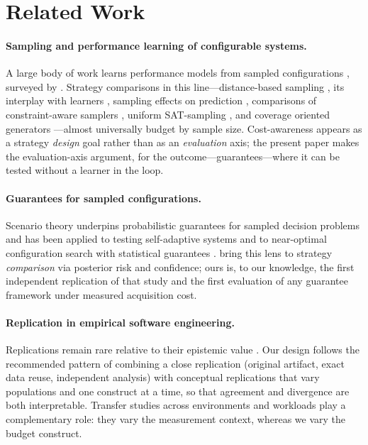 \section{Related Work}
\label{sec:related}

\paragraph{Sampling and performance learning of configurable systems.}
A large body of work learns performance models from sampled
configurations
\citep{guo2013variability,siegmund2015performance,guo2018dataefficient,ha2019deepperf,dorn2023mastering},
surveyed by \citet{pereira2021learning}. Strategy comparisons in this
line---distance-based sampling \citep{kaltenecker2019distance}, its
interplay with learners \citep{kaltenecker2020interplay}, sampling
effects on prediction \citep{pereira2020sampling}, comparisons of
constraint-aware samplers \citep{medeiros2016comparison}, uniform
SAT-sampling \citep{plazar2019uniform,heradio2022uniform}, and coverage
oriented generators \citep{baranov2024baital,hess2024unwise}---almost
universally budget by sample size. Cost-awareness appears as a strategy
\emph{design} goal \citep{sarkar2015cost,nair2017bad,nair2020flash}
rather than as an \emph{evaluation} axis; the present paper makes the
evaluation-axis argument, for the outcome---guarantees---where it can be
tested without a learner in the loop.

\paragraph{Guarantees for sampled configurations.} Scenario theory
\citep{calafiore2006scenario,campi2008exact} underpins probabilistic
guarantees for sampled decision problems and has been applied to testing
self-adaptive systems \citep{mandrioli2020testing} and to near-optimal
configuration search with statistical guarantees
\citep{oh2017srs,oh2023colossal}. \citet{weis2026risk} bring this lens to
strategy \emph{comparison} via posterior risk and confidence; ours is, to
our knowledge, the first independent replication of that study and the
first evaluation of any guarantee framework under measured acquisition
cost.

\paragraph{Replication in empirical software engineering.} Replications
remain rare relative to their epistemic value
\citep{shull2008role,gomez2014understanding}. Our design follows the
recommended pattern of combining a close replication (original artifact,
exact data reuse, independent analysis) with conceptual replications that
vary populations and one construct at a time, so that agreement and
divergence are both interpretable. Transfer studies across environments
and workloads \citep{jamshidi2017transfer,muehlbauer2023workload} play a
complementary role: they vary the measurement context, whereas we vary
the budget construct.
